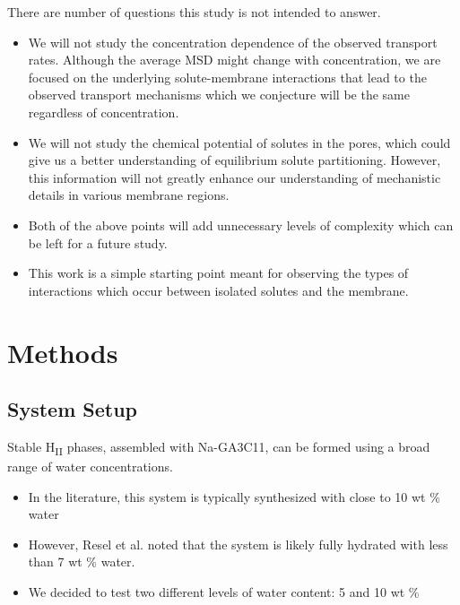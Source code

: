 \documentclass{article}
\begin{document}
  There are number of questions this study is not intended to answer.
  \begin{itemize}
    \item We will not study the concentration dependence of the observed
    transport rates. Although the average MSD might change with concentration,
    we are focused on the underlying solute-membrane interactions that lead to
    the observed transport mechanisms which we conjecture will be the same 
    regardless of concentration.
    \item We will not study the chemical potential of solutes in the pores, which
    could give us a better understanding of equilibrium solute partitioning.
    However, this information will not greatly enhance our understanding of 
    mechanistic details in various membrane regions.
    \item Both of the above points will add unnecessary levels of complexity
    which can be left for a future study. 
    \item This work is a simple starting point meant for observing the types
    of interactions which occur between isolated solutes and the membrane.
  \end{itemize}

  \section{Methods}
  
  \subsection*{System Setup}

  Stable H\textsubscript{II} phases, assembled with Na-GA3C11, can be formed
  using a broad range of water concentrations.
  \begin{itemize}
	\item In the literature, this system is typically synthesized with close
	to 10 wt \% water \cite{smith_ordered_1997, zhou_new_2007}
    \item However, Resel et al. noted that the system is likely fully 
	hydrated with less than 7 wt \% water. \cite{resel_h2-phase_2000}
	\item We decided to test two different levels of water content: 5 and 10 wt \%
  \end{itemize} 
\end{document}
